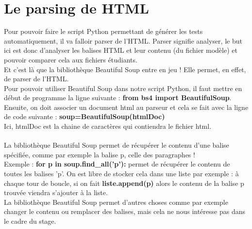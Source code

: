 \documentclass[12pt,twoside]{report}
\begin{document}
\section{Le parsing de HTML}
Pour pouvoir faire le script Python permettant de générer les tests automatiquement, il va falloir parser de l'HTML. Parser signifie analyser, le but ici est donc d'analyser les balises HTML et leur contenu (du fichier modèle) et pouvoir comparer cela aux fichiers étudiants.\\
Et c'est là que la bibliothèque Beautiful Soup entre en jeu ! Elle permet, en effet, de parser de l'HTML.\\
Pour pouvoir utiliser Beautiful Soup dans notre script Python, il faut mettre en début de programme la ligne suivante : \textbf{from bs4 import BeautifulSoup}.\\
Ensuite, on doit associer un document html au parseur et cela se fait avec la ligne de code suivante : \textbf{soup=BeautifulSoup(htmlDoc)}\\
Ici, htmlDoc est la chaine de caractères qui contiendra le fichier html.\\ \\
La bibliothèque Beautiful Soup permet de récupérer le contenu d'une balise spécifiée, comme par exemple la balise p, celle des paragraphes !\\ Exemple : \textbf{for p in soup.find\_all('p'):} permet de récupérer le contenu de toutes les balises 'p'. On est libre de stocker cela dans une liste par exemple : à chaque tour de boucle, si on fait \textbf{liste.append(p)} alors le contenu de la balise p trouvée viendra s'ajouter à la liste.\\
La bibliothèque Beautiful Soup permet d'autres choses comme par exemple changer le contenu ou remplacer des balises, mais cela ne nous intéresse pas dans le cadre du stage. 
\end{document}
